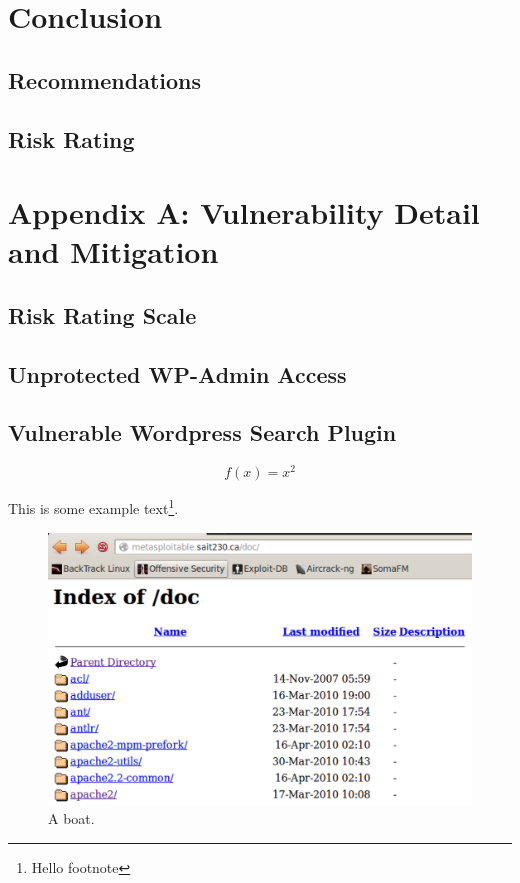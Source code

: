 \documentclass{article}
\begin{document}
\newpage
\section{Conclusion}
\subsection{Recommendations}
\subsection{Risk Rating}

\newpage
\section{Appendix A: Vulnerability Detail and Mitigation}
\subsection{Risk Rating Scale}
\subsection{Unprotected WP-Admin Access}
\subsection{Vulnerable Wordpress Search Plugin}

\begin{equation*}
	f(x) = x^2
\end{equation*}

This is some example text\footnote{\label{myfootnote}Hello footnote}.

\begin{figure}[h!]
	\includegraphics[width=\linewidth]{images/screenshot.png}
	\caption{A boat.}
	\label{fig:boat1}
\end{figure}
\end{document}
